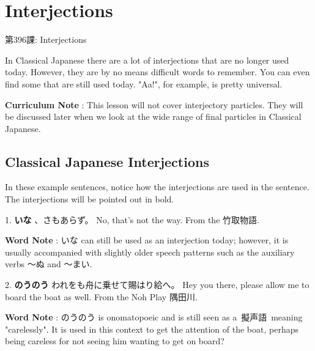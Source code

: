     
\chapter{Interjections}

\begin{center}
\begin{Large}
第396課: Interjections 
\end{Large}
\end{center}
 
\par{In Classical Japanese there are a lot of interjections that are no longer used today. However, they are by no means difficult words to remember. You can even find some that are still used today. "Aa!", for example, is pretty universal. }

\par{\textbf{Curriculum Note }: This lesson will not cover interjectory particles. They will be discussed later when we look at the wide range of final particles in Classical Japanese. }
      
\section{Classical Japanese Interjections}
 
\par{In these example sentences, notice how the interjections are used in the sentence. The interjections will be pointed out in bold. }

\par{1. \textbf{いな }、さもあらず。 \hfill\break
No, that's not the way. \hfill\break
From the 竹取物語. }
 
\par{\textbf{Word Note }: いな can still be used as an interjection today; however, it is usually accompanied with slightly older speech patterns such as the auxiliary verbs ～ぬ and ～まい. }

\par{2. \textbf{のうのう }われをも舟に乗せて賜はり給へ。 \hfill\break
Hey you there, please allow me to board the boat as well. \hfill\break
From the Noh Play 隅田川. }

\par{\textbf{Word Note }: のうのう is onomatopoeic and is still seen as a 擬声語 meaning "carelessly". It is used in this context to get the attention of the boat, perhaps being careless for not seeing him wanting to get on board? }
 
